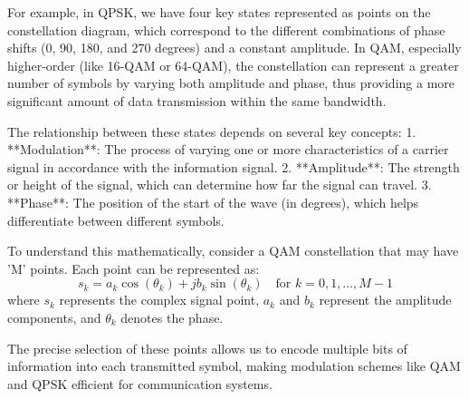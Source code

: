 For example, in QPSK, we have four key states represented as points on the constellation diagram, which correspond to the different combinations of phase shifts (0, 90, 180, and 270 degrees) and a constant amplitude. In QAM, especially higher-order (like 16-QAM or 64-QAM), the constellation can represent a greater number of symbols by varying both amplitude and phase, thus providing a more significant amount of data transmission within the same bandwidth.

The relationship between these states depends on several key concepts:
1. **Modulation**: The process of varying one or more characteristics of a carrier signal in accordance with the information signal.
2. **Amplitude**: The strength or height of the signal, which can determine how far the signal can travel.
3. **Phase**: The position of the start of the wave (in degrees), which helps differentiate between different symbols.

To understand this mathematically, consider a QAM constellation that may have 'M' points. Each point can be represented as:
\[
s_k = a_k \cos(\theta_k) + j b_k \sin(\theta_k) \quad \text{for } k = 0, 1, \ldots, M-1
\]
where \( s_k \) represents the complex signal point, \( a_k \) and \( b_k \) represent the amplitude components, and \( \theta_k \) denotes the phase.

The precise selection of these points allows us to encode multiple bits of information into each transmitted symbol, making modulation schemes like QAM and QPSK efficient for communication systems.

